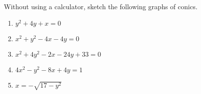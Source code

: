 \begin{solution}
\begin{ppart}
\begin{center}
        \end{center}
    \end{ppart}
\end{solution}

\clearpage
\begin{problem}
    Without using a calculator, sketch the following graphs of conics.

    \begin{enumerate}
        \item $y^2 + 4y + x = 0$
        \item $x^2 + y^2 - 4x - 4y = 0$
        \item $x^2+4y^2-2x-24y+33=0$
        \item $4x^2-y^2-8x+4y=1$
        \item $x = -\sqrt{17-y^2}$ 
    \end{enumerate}
\end{problem}
